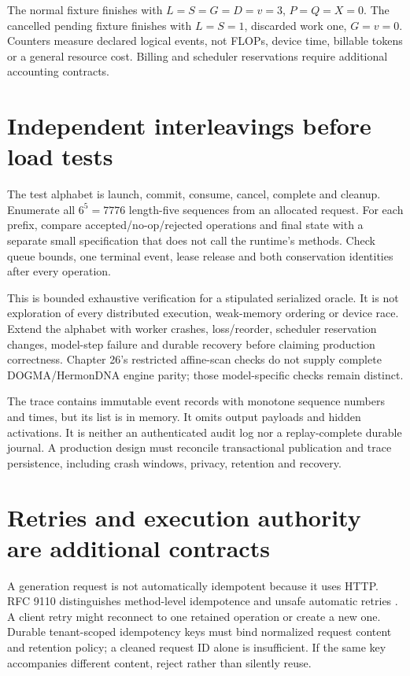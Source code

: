 The normal fixture finishes with $L=S=G=D=v=3$, $P=Q=X=0$.
The cancelled pending fixture finishes with $L=S=1$, discarded work one, $G=v=0$.
Counters measure declared logical events, not FLOPs, device time, billable tokens
or a general resource cost. Billing and scheduler reservations require additional
accounting contracts.

\section{Independent interleavings before load tests}
The test alphabet is launch, commit, consume, cancel, complete and cleanup.
Enumerate all $6^5=7776$ length-five sequences from an allocated request.
For each prefix, compare accepted/no-op/rejected operations and final state with a
separate small specification that does not call the runtime's methods.
Check queue bounds, one terminal event, lease release and both conservation
identities after every operation.

This is bounded exhaustive verification for a stipulated serialized oracle.
It is not exploration of every distributed execution, weak-memory ordering or
device race. Extend the alphabet with worker crashes, loss/reorder, scheduler
reservation changes, model-step failure and durable recovery before claiming
production correctness. Chapter 26's restricted affine-scan checks do not supply
complete DOGMA/HermonDNA engine parity; those model-specific checks remain distinct.

The trace contains immutable event records with monotone sequence numbers and
times, but its list is in memory. It omits output payloads and hidden activations.
It is neither an authenticated audit log nor a replay-complete durable journal.
A production design must reconcile transactional publication and trace persistence,
including crash windows, privacy, retention and recovery.

\section{Retries and execution authority are additional contracts}
A generation request is not automatically idempotent because it uses HTTP.
RFC 9110 distinguishes method-level idempotence and unsafe automatic retries
\cite{evod30:http}. A client retry might reconnect to one retained operation or
create a new one. Durable tenant-scoped idempotency keys must bind normalized
request content and retention policy; a cleaned request ID alone is insufficient.
If the same key accompanies different content, reject rather than silently reuse.

